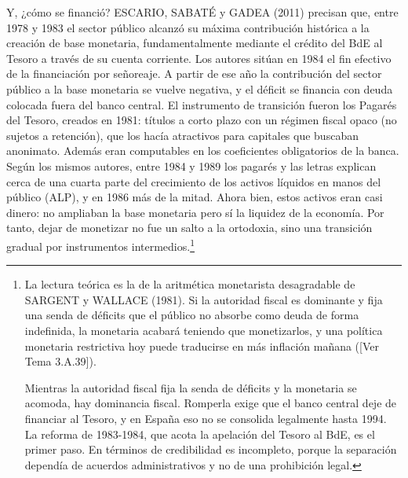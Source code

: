 \documentclass[10pt,a4paper]{article}
\newcommand{\authorfont}[1]{{\fontfamily{EBGaramond-TLF}\selectfont #1}}
\begin{document}
Y, ¿cómo se financió? ESCARIO, SABATÉ y GADEA (2011) precisan que, entre 1978 y 1983 el sector público alcanzó su máxima contribución histórica a la creación de base monetaria, fundamentalmente mediante el crédito del BdE al Tesoro a través de su cuenta corriente. Los autores sitúan en 1984 el fin efectivo de la financiación por señoreaje. A partir de ese año la contribución del sector público a la base monetaria se vuelve negativa, y el déficit se financia con deuda colocada fuera del banco central. El instrumento de transición fueron los Pagarés del Tesoro, creados en 1981: títulos a corto plazo con un régimen fiscal opaco (no sujetos a retención), que los hacía atractivos para capitales que buscaban anonimato. Además eran computables en los coeficientes obligatorios de la banca. Según los mismos autores, entre 1984 y 1989 los pagarés y las letras explican cerca de una cuarta parte del crecimiento de los activos líquidos en manos del público (ALP), y en 1986 más de la mitad. Ahora bien, estos activos eran casi dinero: no ampliaban la base monetaria pero sí la liquidez de la economía. Por tanto, dejar de monetizar no fue un salto a la ortodoxia, sino una transición gradual por instrumentos intermedios.\footnote{%
    La lectura teórica es la de la aritmética monetarista desagradable de SARGENT y WALLACE (1981). Si la autoridad fiscal es dominante y fija una senda de déficits que el público no absorbe como deuda de forma indefinida, la monetaria acabará teniendo que monetizarlos, y una política monetaria restrictiva hoy puede traducirse en más inflación mañana ([\authorfont{Ver Tema 3.A.39}]).

Mientras la autoridad fiscal fija la senda de déficits y la monetaria se acomoda, hay dominancia fiscal. Romperla exige que el banco central deje de financiar al Tesoro, y en España eso no se consolida legalmente hasta 1994. La reforma de 1983-1984, que acota la apelación del Tesoro al BdE, es el primer paso. En términos de credibilidad es incompleto, porque la separación dependía de acuerdos administrativos y no de una prohibición legal.
} 
\end{document}
